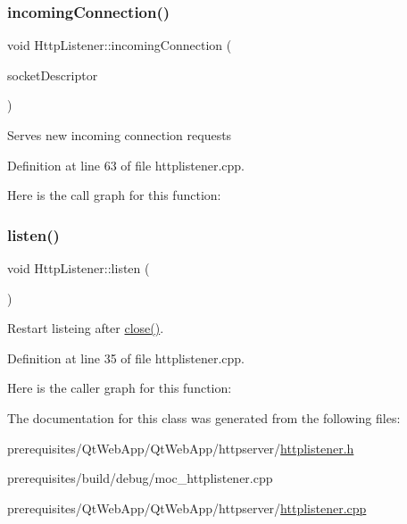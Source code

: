 \subsubsection{\texorpdfstring{incoming\+Connection()}{incomingConnection()}}
{\footnotesize\ttfamily void Http\+Listener\+::incoming\+Connection (\begin{DoxyParamCaption}\item[{\mbox{\hyperlink{httpconnectionhandler_8h_a9884f8c3364a6510f6118c5336fd0458}{t\+Socket\+Descriptor}}}]{socket\+Descriptor }\end{DoxyParamCaption})\hspace{0.3cm}{\ttfamily [protected]}}

Serves new incoming connection requests 

Definition at line 63 of file httplistener.\+cpp.

Here is the call graph for this function\+:
\mbox{\label{classstefanfrings_1_1_http_listener_a39cf1136caf6ba96554ef0a48fbff052}} 
\subsubsection{\texorpdfstring{listen()}{listen()}}
{\footnotesize\ttfamily void Http\+Listener\+::listen (\begin{DoxyParamCaption}{ }\end{DoxyParamCaption})}

Restart listeing after \mbox{\hyperlink{classstefanfrings_1_1_http_listener_a5f5f2463036bc9a17f9fe8eb5c17c7f5}{close()}}. 

Definition at line 35 of file httplistener.\+cpp.

Here is the caller graph for this function\+:


The documentation for this class was generated from the following files\+:\begin{DoxyCompactItemize}
\item 
prerequisites/\+Qt\+Web\+App/\+Qt\+Web\+App/httpserver/\mbox{\hyperlink{httplistener_8h}{httplistener.\+h}}\item 
prerequisites/build/debug/moc\+\_\+httplistener.\+cpp\item 
prerequisites/\+Qt\+Web\+App/\+Qt\+Web\+App/httpserver/\mbox{\hyperlink{httplistener_8cpp}{httplistener.\+cpp}}\end{DoxyCompactItemize}
